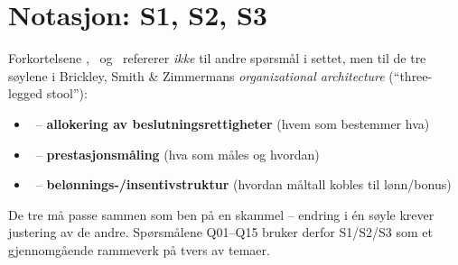 \documentclass[11pt, a4paper]{article}
\begin{document}
\maketitle
\tableofcontents

\section*{Notasjon: S1, S2, S3}
Forkortelsene \SOne, \STwo\ og \SThree\ refererer \emph{ikke} til andre spørsmål i settet, men til de tre søylene i Brickley, Smith \& Zimmermans \emph{organizational architecture} (\enquote{three-legged stool}):
\begin{itemize}
  \item \SOne\ -- \textbf{allokering av beslutningsrettigheter} (hvem som bestemmer hva)
  \item \STwo\ -- \textbf{prestasjonsmåling} (hva som måles og hvordan)
  \item \SThree\ -- \textbf{belønnings-/insentivstruktur} (hvordan måltall kobles til lønn/bonus)
\end{itemize}
De tre må passe sammen som ben på en skammel -- endring i én søyle krever justering av de andre. Spørsmålene Q01--Q15 bruker derfor S1/S2/S3 som et gjennomgående rammeverk på tvers av temaer.
\end{document}

